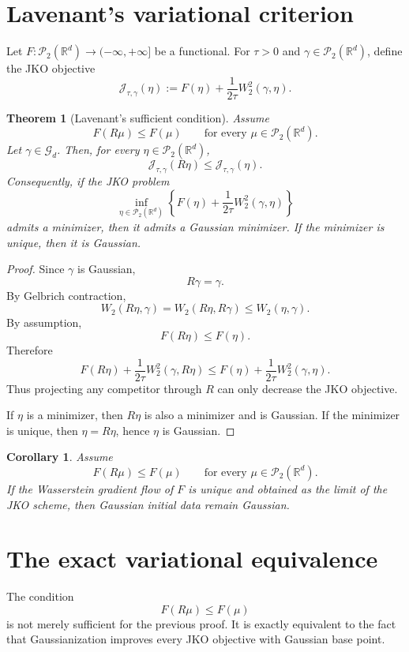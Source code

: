 \documentclass[11pt]{article}
\newtheorem{theorem}{Theorem}
\newtheorem{corollary}{Corollary}
\newcommand{\R}{\mathbb R}
\newcommand{\W}{W}
\begin{document}
\section{Lavenant's variational criterion}

Let $F:\mathcal P_2(\R^d)\to(-\infty,+\infty]$ be a functional. For
$\tau>0$ and $\gamma\in\mathcal P_2(\R^d)$, define the JKO objective
\[
\mathcal J_{\tau,\gamma}(\eta)
:=
F(\eta)+\frac{1}{2\tau}\W_2^2(\gamma,\eta).
\]

\begin{theorem}[Lavenant's sufficient condition]
Assume
\[
F(R\mu)\le F(\mu)
\qquad
\text{for every }\mu\in\mathcal P_2(\R^d).
\]
Let $\gamma\in\mathcal G_d$. Then, for every $\eta\in\mathcal P_2(\R^d)$,
\[
\mathcal J_{\tau,\gamma}(R\eta)
\le
\mathcal J_{\tau,\gamma}(\eta).
\]
Consequently, if the JKO problem
\[
\inf_{\eta\in\mathcal P_2(\R^d)}
\left\{
F(\eta)+\frac{1}{2\tau}\W_2^2(\gamma,\eta)
\right\}
\]
admits a minimizer, then it admits a Gaussian minimizer. If the minimizer is
unique, then it is Gaussian.
\end{theorem}

\begin{proof}
Since $\gamma$ is Gaussian,
\[
R\gamma=\gamma.
\]
By Gelbrich contraction,
\[
\W_2(R\eta,\gamma)
=
\W_2(R\eta,R\gamma)
\le
\W_2(\eta,\gamma).
\]
By assumption,
\[
F(R\eta)\le F(\eta).
\]
Therefore
\[
F(R\eta)+\frac{1}{2\tau}\W_2^2(\gamma,R\eta)
\le
F(\eta)+\frac{1}{2\tau}\W_2^2(\gamma,\eta).
\]
Thus projecting any competitor through $R$ can only decrease the JKO objective.

If $\eta$ is a minimizer, then $R\eta$ is also a minimizer and is Gaussian.
If the minimizer is unique, then $\eta=R\eta$, hence $\eta$ is Gaussian.
\end{proof}

\begin{corollary}
Assume
\[
F(R\mu)\le F(\mu)
\qquad
\text{for every }\mu\in\mathcal P_2(\R^d).
\]
If the Wasserstein gradient flow of $F$ is unique and obtained as the limit of
the JKO scheme, then Gaussian initial data remain Gaussian.
\end{corollary}

\section{The exact variational equivalence}

The condition
\[
F(R\mu)\le F(\mu)
\]
is not merely sufficient for the previous proof. It is exactly equivalent to
the fact that Gaussianization improves every JKO objective with Gaussian base
point.
\end{document}
